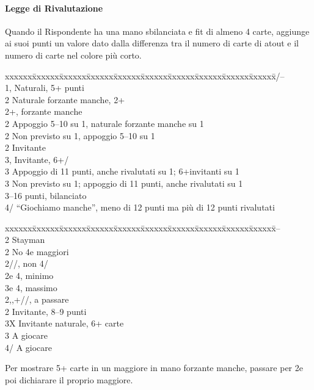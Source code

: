 \documentclass[a4paper,italian,12pt]{article}
\newcommand\SA{{\smaller{SA}}\xspace}
\newenvironment{bidtable}
{\begin{tabbing}

    xxxxxx\=xxxxxx\=xxxxxx\=xxxxxx\=xxxxxx\=xxxxxx\=xxxxxx\=xxxxxx\=xxxxxx\=xxxxxx\=\kill}
{\end{tabbing} }%
\begin{document}
\paragraph{Legge di Rivalutazione}
Quando il Rispondente ha una mano sbilanciata e fit di almeno 4 carte, aggiunge ai suoi punti un valore dato dalla
differenza tra il numero di carte di atout e il numero di carte nel colore più corto.

\begin{bidtable}
    1\He/\Sp--\+\\
    1\Sp,\SA \> \> Naturali, 5+ punti\\
    2\Cl \>\> Naturale forzante manche, 2+\Cl\\
    2\Di \>+\Di, forzante manche\\
    2\He \>\> Appoggio 5--10 su 1\He, naturale forzante manche su 1\Sp\\
    2\Sp\>\> Non previsto su 1\He, appoggio 5--10 su 1\Sp\\
    2\SA \>\> Invitante\\
    3\Cl,\Di \>\> Invitante, 6+\Cl/\Di\\
    3\He \>\> Appoggio di 11 punti, anche rivalutati su 1\He; 6+\He invitanti su 1\Sp\\
    3\Sp \>\> Non previsto su 1\He; appoggio di 11 punti, anche rivalutati su 1\Sp\\
    3\SA \>--16 punti, bilanciato\\
    4\He/\Sp \>\> ``Giochiamo manche'', meno di 12 punti ma più di 12 punti rivalutati
\end{bidtable}

\begin{bidtable}
    1\SA--\+\\
    2\Cl\>\> Stayman\+\+\\
    2\Di\> No 4e maggiori\\
    2\He/\Sp {}\He/\Sp, non 4\Sp/\He\\
    2\SA {}\He e 4\Sp, minimo\\
    3\Cl {}\He e 4\Sp, massimo\-\-\\
    2\Di,\He,\Sp \>+\Di/\He/\Sp, a passare\\
    2\SA \>\> Invitante, 8--9 punti\\
    3X \>\> Invitante naturale, 6+ carte\\
    3\SA \>\> A giocare\\
    4\He/\Sp \>\> A giocare
\end{bidtable}
Per mostrare 5+ carte in un maggiore in mano forzante manche, passare per 2\Cl e poi dichiarare il proprio maggiore.
\end{document}
